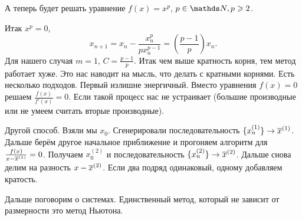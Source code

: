 А теперь будет решать уравнение $f(x) = x^p$, $p\in \N,p\ge 2$.

Итак $x^p = 0$, 
\[
 x_{n+1} = x_n - \frac{x_n^p}{p x_n^{p-1}} = \left( \frac{p-1}{p} \right)x_n.
\]
Для нашего случая $m=1$, $C = \frac{p-1}{p}$. Итак чем выше кратность корня, тем метод работает хуже. Это нас наводит на мысль, что делать с кратными корнями. Есть несколько подходов. Первый излишне энергичный. Вместо уравнения $f(x) = 0$ решаем $\frac{f(x)}{f'(x)} = 0$. Если такой процесс нас не устраивает (большие производные или не умеем считать вторые производные).

Другой способ. Взяли мы $x_0$. Сгенерировали последовательность $\{x_n^{(1)}\} \rightarrow \overline{x}^{(1)}$. Дальше берём другое начальное приближение и прогоняем алгоритм для $\frac{f(x)}{x - 
\overline{x}^{(1)}} = 0$. Получаем $x_0^{(2)}$ и последовательность $\{x_n^{(2)}\} \rightarrow \overline{x}^{(2)}$. Дальше снова делим на разность $x-\overline{x}^{(2)}$. Если два подряд одинаковый, одному добавляем кратость. 

Дальше поговорим о системах. Единственный метод, который не зависит от размерности это метод Ньютона.
